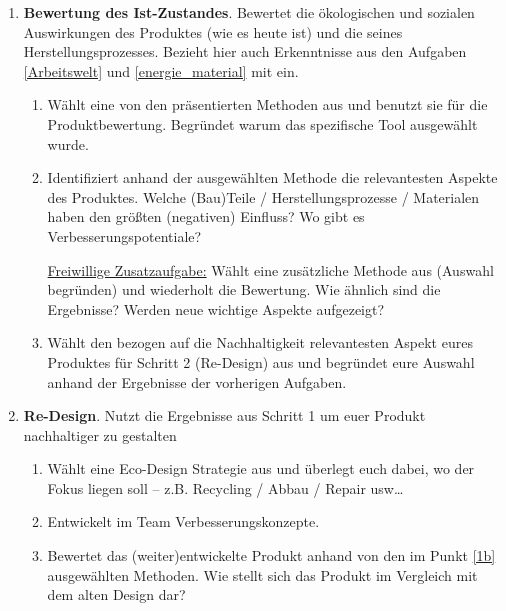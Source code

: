 \documentclass[headinclude=true]{scrartcl}
\begin{document}
\begin{enumerate}
	\item
	      \textbf{Bewertung des Ist-Zustandes}. Bewertet die ökologischen und sozialen Auswirkungen des Produktes (wie es heute ist) und die seines Herstellungsprozesses. Bezieht hier auch Erkenntnisse aus den Aufgaben \ref{Arbeitswelt} und \ref{energie_material} mit ein. 

	      \begin{enumerate}
		      \item
		            Wählt eine von den präsentierten Methoden aus und benutzt sie für die Produktbewertung. Begründet warum das spezifische Tool ausgewählt wurde.
		      \item \label{1b}
		            
		            Identifiziert anhand der ausgewählten Methode die relevantesten Aspekte des Produktes. Welche (Bau)Teile / Herstellungsprozesse / Materialen haben den größten (negativen) Einfluss? Wo
		            gibt es Verbesserungspotentiale?
		            
		            \underline{Freiwillige Zusatzaufgabe:} Wählt eine zusätzliche Methode aus (Auswahl begründen) und wiederholt die Bewertung. Wie ähnlich sind die Ergebnisse? Werden neue wichtige Aspekte aufgezeigt?
		      \item
		            Wählt den bezogen auf die Nachhaltigkeit relevantesten Aspekt eures Produktes für Schritt 2 (Re-Design) aus und begründet eure Auswahl anhand der Ergebnisse der vorherigen Aufgaben.
		            
	      \end{enumerate}
	\item
	      \textbf{Re-Design}. Nutzt die Ergebnisse aus Schritt 1 um euer Produkt nachhaltiger zu gestalten

	      \begin{enumerate}
		      \item
		            Wählt eine Eco-Design Strategie aus und überlegt euch dabei, wo der Fokus liegen soll --
		            z.B. Recycling / Abbau / Repair usw\ldots{}
		      \item
		            Entwickelt im Team Verbesserungskonzepte.
		      \item
		            Bewertet das (weiter)entwickelte Produkt anhand von den im Punkt \ref{1b} ausgewählten Methoden. Wie stellt sich das Produkt im Vergleich mit dem alten Design dar?
	      \end{enumerate}
\end{enumerate}

\cleardoublepage
{}
\printbibliography
\end{document}

